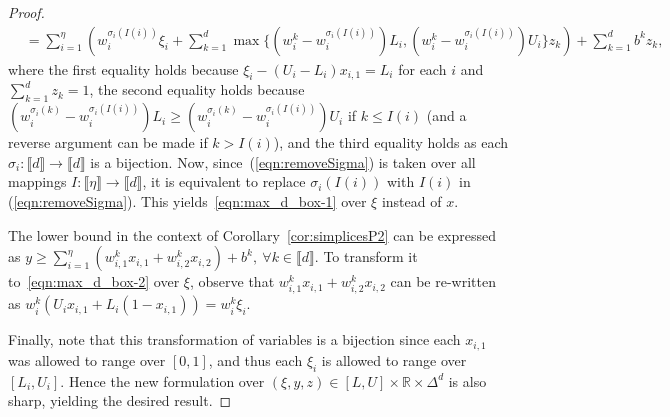 \documentclass[smallextended]{svjour3}
\begin{document}
\begin{proof}
\begin{align}
&=\sum_{i=1}^{\eta}\left(w^{\sigma_i(I(i))}_i\xi_i+\sum_{k=1}^d\max\{(w^{k}_i-w^{\sigma_i(I(i))}_i)L_i,(w^{k}_i-w^{\sigma_i(I(i))}_i)U_i\}z_k\right)+\sum_{k=1}^db^kz_k, \label{eqn:removeSigma}
\end{align}
where the first equality holds because $\xi_i-(U_i-L_i)x_{i,1}=L_i$ for each $i$ and $\sum_{k=1}^d z_k=1$, the second equality holds because $(w^{\sigma_i(k)}_i-w^{\sigma_i(I(i))}_i)L_i\ge(w^{\sigma_i(k)}_i-w^{\sigma_i(I(i))}_i)U_i$ if $k\le I(i)$ (and a reverse argument can be made if $k>I(i)$), and the third equality holds as each $\sigma_i:\llbracket d\rrbracket\to\llbracket d\rrbracket$ is a bijection. Now, since~(\ref{eqn:removeSigma}) is taken over all mappings $I:\llbracket\eta\rrbracket\to\llbracket d\rrbracket$, it is equivalent to replace $\sigma_i(I(i))$ with $I(i)$ in (\ref{eqn:removeSigma}). This yields~\eqref{eqn:max_d_box-1} over $\xi$ instead of $x$.

The lower bound in the context of Corollary~\ref{cor:simplicesP2} can be expressed as $y \geq \sum_{i=1}^{\eta}(w^k_{i,1}x_{i,1}+w^k_{i,2}x_{i,2}) + b^k,\ \forall k \in \llbracket d \rrbracket$. To transform it to~\eqref{eqn:max_d_box-2} over $\xi$, observe that $w^k_{i,1}x_{i,1}+w^k_{i,2}x_{i,2}$ can be re-written as $w^k_i(U_ix_{i,1}+L_i(1-x_{i,1}))=w^k_i\xi_i$.

Finally, note that this transformation of variables is a bijection since each $x_{i,1}$ was allowed to range over $[0,1]$, and thus each $\xi_i$ is allowed to range over $[L_i,U_i]$. Hence the new formulation over $(\xi,y,z)\in[L,U]\times\mathbb{R}\times\Delta^d$ is also sharp, yielding the desired result.


\end{proof}
\end{document}
